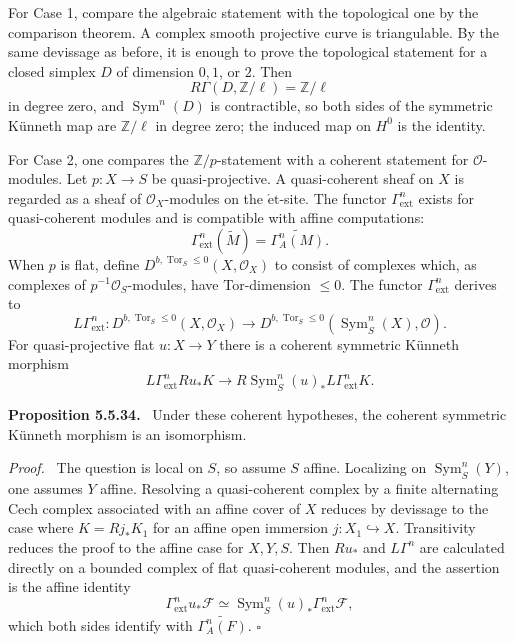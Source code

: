 \documentclass[12pt]{article}
\newcommand{\Ff}{\mathcal F}
\newcommand{\Oo}{\mathcal O}
\newcommand{\Zz}{\mathbb Z}
\DeclareMathOperator{\Sym}{Sym}
\newcommand{\et}{\mathrm{\acute et}}
\newcommand{\tor}{\operatorname{Tor}}
\newcommand{\qedtext}{\hfill\(\square\)}
\newenvironment{statement}[1]{\par\medskip\noindent\textbf{#1.}\ }{\par\medskip}
\newenvironment{prooftext}[1][Proof]{\par\noindent\emph{#1.}\ }{\par\medskip}
\begin{document}
For Case 1, compare the algebraic statement with the topological one by the comparison theorem. A complex smooth projective curve is triangulable. By the same devissage as before, it is enough to prove the topological statement for a closed simplex \(D\) of dimension \(0,1\), or \(2\). Then
\[
R\Gamma(D,\Zz/\ell)=\Zz/\ell
\]
in degree zero, and \(\Sym^n(D)\) is contractible, so both sides of the symmetric K\"unneth map are \(\Zz/\ell\) in degree zero; the induced map on \(H^0\) is the identity.

For Case 2, one compares the \(\Zz/p\)-statement with a coherent statement for \(\Oo\)-modules. Let \(p:X\to S\) be quasi-projective. A quasi-coherent sheaf on \(X\) is regarded as a sheaf of \(\Oo_X\)-modules on the \(\et\)-site. The functor \(\Gamma^n_{\mathrm{ext}}\) exists for quasi-coherent modules and is compatible with affine computations:
\[
\Gamma^n_{\mathrm{ext}}(\widetilde M)=\widetilde{\Gamma^n_A(M)}.
\]
When \(p\) is flat, define \(D^{b,\tor_S\le0}(X,\Oo_X)\) to consist of complexes which, as complexes of \(p^{-1}\Oo_S\)-modules, have Tor-dimension \(\le0\). The functor \(\Gamma^n_{\mathrm{ext}}\) derives to
\[
L\Gamma^n_{\mathrm{ext}}:D^{b,\tor_S\le0}(X,\Oo_X)
\to
D^{b,\tor_S\le0}(\Sym^n_S(X),\Oo).
\]
For quasi-projective flat \(u:X\to Y\) there is a coherent symmetric K\"unneth morphism
\[
L\Gamma^n_{\mathrm{ext}}Ru_*K
\longrightarrow
R\Sym^n_S(u)_*L\Gamma^n_{\mathrm{ext}}K.
\]

\begin{statement}{Proposition 5.5.34}
Under these coherent hypotheses, the coherent symmetric K\"unneth morphism is an isomorphism.
\end{statement}

\begin{prooftext}
The question is local on \(S\), so assume \(S\) affine. Localizing on \(\Sym^n_S(Y)\), one assumes \(Y\) affine. Resolving a quasi-coherent complex by a finite alternating Cech complex associated with an affine cover of \(X\) reduces by devissage to the case where \(K=Rj_*K_1\) for an affine open immersion \(j:X_1\hookrightarrow X\). Transitivity reduces the proof to the affine case for \(X,Y,S\). Then \(Ru_*\) and \(L\Gamma^n\) are calculated directly on a bounded complex of flat quasi-coherent modules, and the assertion is the affine identity
\[
\Gamma^n_{\mathrm{ext}}u_*\Ff
\simeq
\Sym^n_S(u)_*\Gamma^n_{\mathrm{ext}}\Ff,
\]
which both sides identify with \(\widetilde{\Gamma^n_A(F)}\). \qedtext
\end{prooftext}
\end{document}
